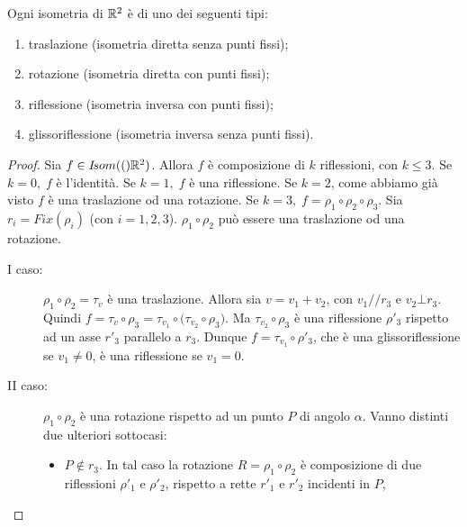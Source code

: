 \documentclass[a4paper,12pt]{article}
\newcommand{\Got}[1]{#1}
\newcommand{\got}[1]{{#1}}
\begin{document}
 \begin{theorem}
 
\Got{Ogni isometria di} $\got{\R^2}$ \Got{è di uno dei seguenti tipi:}
 \begin{enumerate}[label=\bf\Roman*)]
  \item \Got{traslazione (isometria diretta senza punti fissi)};
  \item \Got{rotazione (isometria diretta con punti fissi)};
  \item \Got{riflessione (isometria inversa con punti fissi)};
  \item \Got{glissoriflessione (isometria inversa senza punti fissi).}
 \end{enumerate} 
 \end{theorem}
 \begin{proof}
 \Got{Sia} $\got{f\in \Isom(\R^2)}$. \Got{Allora} $\got{f}$ \Got{è composizione di} $\got{k}$ \Got{riflessioni, con}
 $\got{k\le 3}$.
 \Got{Se} $\got{k=0,\; f}$ \Got{è l'identità.
 Se} $\got{k=1,\; f}$ \Got{è una riflessione.
 Se} $\got{k=2}$, \Got{come abbiamo già visto} $\got{f}$ \Got{è una traslazione od una rotazione.
 Se} $\got{k=3,\; f=\rho_1}\circ\got{\rho_2}\circ\got{\rho_3}$. \Got{Sia} $\got{r_i=Fix(\rho_i)}$ \Got{(con} $\got{i=1,2,3}$).
 $\got{\rho_1}\circ\got{\rho_2}$ \Got{può essere una traslazione od una rotazione.}
 \begin{description}
 \item[I caso:] \Got{}$\got{\rho_1}\circ\got{\rho_2=\tau_v}$ \Got{è una traslazione.
 Allora sia} $\got{v=v_1+v_2}$, \Got{con} $\got{v_1//r_3}$ \Got{e} $\got{v_2\bot r_3}$.
 \Got{Quindi} $\got{f=\tau_v}\circ\got{\rho_3=\tau_{v_1}}\circ\got{(\tau_{v_2}}\circ\got{\rho_3)}$. \Got{Ma} $\got{\tau_{v_2}}\circ\got{\rho_3}$
 \Got{è una riflessione}
 $\got{\rho'_3}$ \Got{rispetto ad un asse} $\got{r'_3}$ \Got{parallelo a} $\got{r_3}$.
 \Got{Dunque} $\got{f=\tau_{v_1}}\circ\got{\rho'_3}$, \Got{che è una glissoriflessione se} $\got{v_1\ne 0}$, \Got{è una riflessione se} 
 $\got{v_1=0}$.
 \item[II caso:] \Got{}$\got{\rho_1}\circ\got{\rho_2}$ \Got{è una rotazione rispetto ad un punto} $\got{P}$ \Got{di angolo} $\got{\alpha}$.
 \Got{Vanno distinti due ulteriori sottocasi:}
 \begin{itemize}
  \item $\got{P\notin r_3}$. \Got{In tal caso la rotazione} $\got{R=\rho_1}\circ\got{\rho_2}$ \Got{è composizione di due riflessioni}
  $\got{\rho'_1}$
  \Got{e} $\got{\rho'_2}$, \Got{rispetto a rette} $\got{r'_1}$ \Got{e} $\got{r'_2}$ \Got{incidenti in} $\got{P}$,

\end{itemize}
\end{description}
\end{proof}
\end{document}
